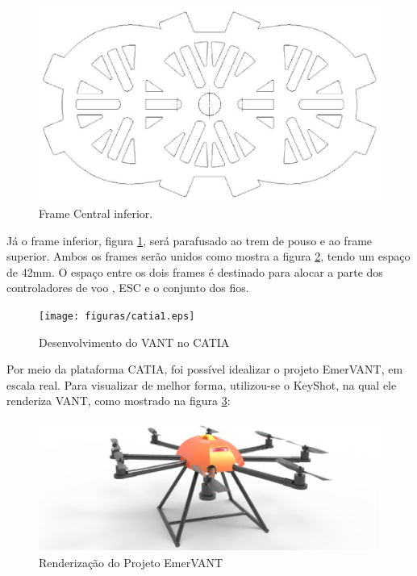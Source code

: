 \begin{figure}[H]
    \centering
      \includegraphics[keepaspectratio=true,scale=0.5]{figuras/drawinfinfo.eps}
    \caption{ Frame Central inferior.}
    \label{fig:drawinfinfo}
\end{figure}

Já o frame inferior, figura \ref{fig:drawinfinfo}, será parafusado ao trem de pouso e ao frame superior.  Ambos os frames serão unidos como mostra a figura \ref{fig:catia1}, tendo um espaço de 42mm. O espaço entre os dois frames é destinado para alocar a parte dos controladores de voo , ESC e o conjunto dos fios.

\begin{figure}[H]
    \centering
      \texttt{[image: figuras/catia1.eps]}
    \caption{Desenvolvimento do VANT no CATIA}
    \label{fig:catia1}
\end{figure}

Por meio da plataforma CATIA, foi possível idealizar o projeto EmerVANT, em escala real. Para visualizar de melhor forma, utilizou-se o KeyShot, na qual ele renderiza VANT, como mostrado na figura \ref{fig:keyshot1}:

\begin{figure}[H]
    \centering
      \includegraphics[keepaspectratio=true,scale=0.5]{figuras/keyshot1.eps}
    \caption{ Renderização do Projeto EmerVANT}
    \label{fig:keyshot1}
\end{figure}


